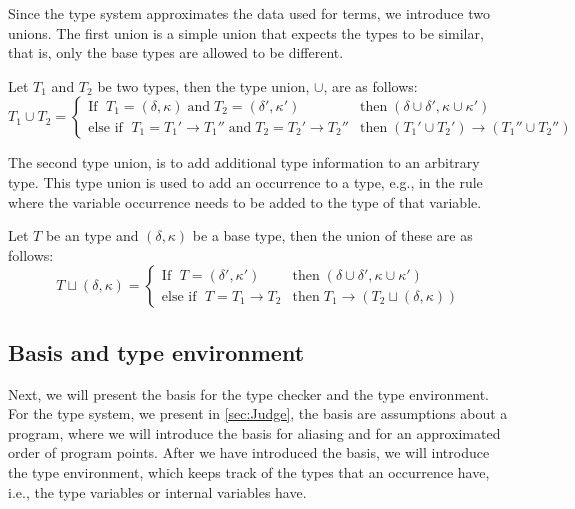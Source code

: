 \documentclass[../../master.tex]{subfiles}
\begin{document}
Since the type system approximates the data used for terms, we introduce two unions.
The first union is a simple union that expects the types to be similar, that is, only the base types are allowed to be different.
\begin{definition}
	Let $T_1$ and $T_2$ be two types, then the type union, $\cup$, are as follows:
	\begin{equation*}
		T_1\cup T_2=
		\left\{\begin{matrix}
			\mbox{If } \; T_1=(\delta,\kappa) \;\mbox{and}\; T_2=(\delta',\kappa')  & \mbox{then} \; (\delta\cup\delta',\kappa\cup\kappa')\\
			\mbox{else if } \; T_1=T_1'\rightarrow T_1''\;\mbox{and}\;T_2=T_2'\rightarrow T_2'' & \mbox{then} \; (T_1'\cup T_2')\rightarrow (T_1''\cup T_2'')
		\end{matrix}\right.
	\end{equation*}
\end{definition}

The second type union, is to add additional type information to an arbitrary type.
This type union is used to add an occurrence to a type, e.g., in the  rule where the variable occurrence needs to be added to the type of that variable.
\begin{definition}
	Let $T$ be an type and $(\delta,\kappa)$ be a base type, then the union of these are as follows:
	\begin{equation*}
		T\sqcup (\delta,\kappa)=
		\left\{\begin{matrix}
			\mbox{If } \; T=(\delta',\kappa')  & \mbox{then} \; (\delta\cup\delta',\kappa\cup\kappa')\\
			\mbox{else if } \; T=T_1\rightarrow T_2 & \mbox{then} \; T_1\rightarrow(T_2\sqcup (\delta,\kappa))
		\end{matrix}\right.
	\end{equation*}
\end{definition}

\subsection{Basis and type environment}
Next, we will present the basis for the type checker and the type environment.
For the type system, we present in \cref{sec:Judge}, the basis are assumptions about a program, where we will introduce the basis for aliasing and for an approximated order of program points.
After we have introduced the basis, we will introduce the type environment, which keeps track of the types that an occurrence have, i.e., the type variables or internal variables have.
\end{document}

